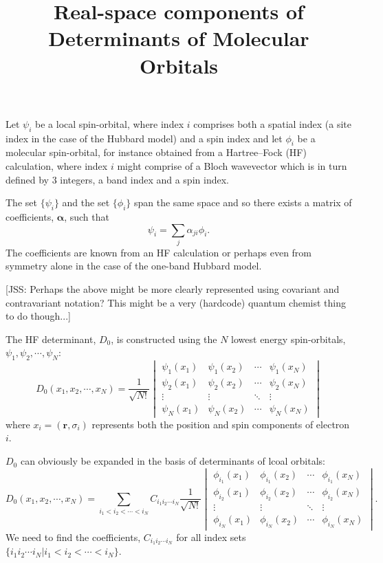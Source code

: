 \documentclass[a4paper, 11pt]{revtex4}
\newcommand{\br}{\mathbf{r}}
\begin{document}
\title{Real-space components of Determinants of Molecular Orbitals}

\maketitle

Let $\psi_i$ be a local spin-orbital, where index $i$ comprises both a spatial index (a site index in the case of the Hubbard model) and a spin index and let $\phi_i$ be a molecular spin-orbital, for instance obtained from a Hartree--Fock (HF) calculation, where index $i$ might comprise of a Bloch wavevector which is in turn defined by 3 integers, a band index and a spin index.

The set $\{\psi_i\}$ and the set $\{\phi_i\}$ span the same space and so there exists a matrix of coefficients, $\boldsymbol{\alpha}$, such that
\begin{equation}
\psi_i = \sum_j \alpha_{ji} \phi_i.
\end{equation}
The coefficients are known from an HF calculation or perhaps even from symmetry alone in the case of the one-band Hubbard model.

[JSS: Perhaps the above might be more clearly represented using covariant and contravariant notation?  This might be a very (hardcode) quantum chemist thing to do though...]

The HF determinant, $D_0$, is constructed using the $N$ lowest energy spin-orbitals, $\psi_1, \psi_2, \cdots, \psi_N$:
\begin{equation}
D_0(x_1, x_2, \cdots, x_N) = \frac{1}{\sqrt{N!}}
\begin{vmatrix}
\psi_1(x_1) & \psi_1(x_2) & \cdots & \psi_1(x_N) \\
\psi_2(x_1) & \psi_2(x_2) & \cdots & \psi_2(x_N) \\
\vdots      & \vdots      & \ddots & \vdots      \\
\psi_N(x_1) & \psi_N(x_2) & \cdots & \psi_N(x_N)
\end{vmatrix}
\end{equation}
where $x_i=(\br,\sigma_i)$ represents both the position and spin components of electron $i$.

$D_0$ can obviously be expanded in the basis of determinants of lcoal orbitals:
\begin{equation}
D_0(x_1, x_2, \cdots, x_N) = \sum_{i_1<i_2<\cdots<i_N} C_{i_1i_2\cdots i_N} \frac{1}{\sqrt{N!}}
\begin{vmatrix}
\phi_{i_1}(x_1) & \phi_{i_1}(x_2) & \cdots & \phi_{i_1}(x_N) \\
\phi_{i_2}(x_1) & \phi_{i_2}(x_2) & \cdots & \phi_{i_2}(x_N) \\
\vdots      & \vdots      & \ddots & \vdots      \\
\phi_{i_N}(x_1) & \phi_{i_N}(x_2) & \cdots & \phi_{i_N}(x_N)
\end{vmatrix}.
\end{equation}
We need to find the coefficients, $C_{i_1i_2\cdots i_N}$ for all index sets $\{i_1i_2\cdots i_N|i_1<i_2<\cdots<i_N\}$.
\end{document}

